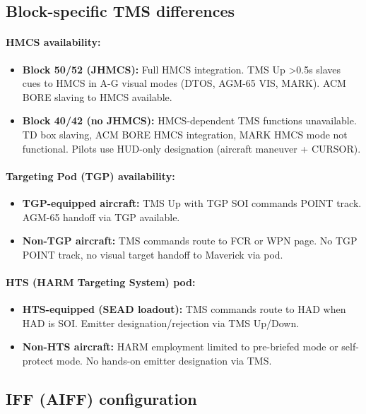 \documentclass[11pt, a4paper, twoside]{report}
\begin{document}
\subsection{Block-specific TMS differences}
\label{sec:C4-S6-S1}

\paragraph{HMCS availability:}
\begin{itemize}
    \item \textbf{Block 50/52 (JHMCS):} Full HMCS integration. TMS Up >0.5s slaves cues to HMCS in A-G visual modes (DTOS, AGM-65 VIS, MARK). ACM BORE slaving to HMCS available.
    \item \textbf{Block 40/42 (no JHMCS):} HMCS-dependent TMS functions unavailable. TD box slaving, ACM BORE HMCS integration, MARK HMCS mode not functional. Pilots use HUD-only designation (aircraft maneuver + CURSOR).
\end{itemize}

\paragraph{Targeting Pod (TGP) availability:}
\begin{itemize}
    \item \textbf{TGP-equipped aircraft:} TMS Up with TGP SOI commands POINT track. AGM-65 handoff via TGP available.
    \item \textbf{Non-TGP aircraft:} TMS commands route to FCR or WPN page. No TGP POINT track, no visual target handoff to Maverick via pod.
\end{itemize}

\paragraph{HTS (HARM Targeting System) pod:}
\begin{itemize}
    \item \textbf{HTS-equipped (SEAD loadout):} TMS commands route to HAD when HAD is SOI. Emitter designation/rejection via TMS Up/Down.
    \item \textbf{Non-HTS aircraft:} HARM employment limited to pre-briefed mode or self-protect mode. No hands-on emitter designation via TMS.
\end{itemize}

\subsection{IFF (AIFF) configuration}
\label{sec:C4-S6-S2}
\end{document}

